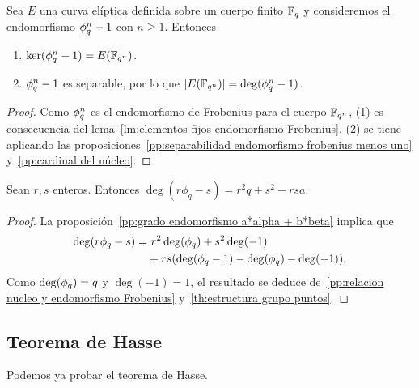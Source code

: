 \begin{proposicion}\label{pp:relacion nucleo y endomorfismo Frobenius}
	Sea $E$ una curva elíptica definida sobre un cuerpo finito $\mathbb{F}_q$ y consideremos el endomorfismo $\phi_q^n - 1$ con $n \ge 1$. Entonces
	\begin{enumerate}
		\item $\ker(\phi_q^n - 1) = E(\mathbb{F}_{q^n})$.
		\item $\phi_q^n - 1$ es separable, por lo que $\left\vert{E(\mathbb{F}_{q^n})}\right\vert = \deg(\phi_q^n - 1)$.
	\end{enumerate}
\end{proposicion}
\begin{proof}
Como $\phi_q^n$ es el endomorfismo de Frobenius para el cuerpo $\mathbb{F}_{q^n}$, (1) es consecuencia del lema~\ref{lm:elementos fijos endomorfismo Frobenius}. (2) se tiene aplicando las proposiciones~\ref{pp:separabilidad endomorfismo frobenius menos uno} y~\ref{pp:cardinal del núcleo}.
\end{proof}

\begin{lema}\label{lm:descomposicion grado frobenius}
	Sean $r, s$ enteros. Entonces $\deg(r \phi_q - s) = r^2 q + s^2 - rsa$.
\end{lema}
\begin{proof}
La proposición~\ref{pp:grado endomorfismo a*alpha + b*beta} implica que
\begin{align*}
	\deg(r \phi_q - s) =& \ r^2 \deg(\phi_q) + s^2 \deg(-1) \\
	&+ r s (\deg(\phi_q - 1) - \deg(\phi_q) - \deg(-1)).
\end{align*}
Como $\deg(\phi_q) = q$ y $\deg(-1) = 1$, el resultado se deduce de~\ref{pp:relacion nucleo y endomorfismo Frobenius} y~\ref{th:estructura grupo puntos}.
\end{proof}

\subsection{Teorema de Hasse}
\label{sub:Teorema de Hasse}

Podemos ya probar el teorema de Hasse.

